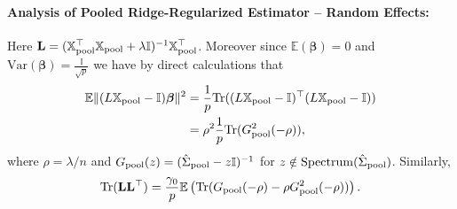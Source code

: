 \documentclass{article}
\theoremstyle{plain}
\theoremstyle{remark}
\def \bbeta{\boldsymbol{\beta}}
\def \bbeta{\boldsymbol{\beta}}
\def \Xm {\mathbb{X}_{\rm pool}}
\def \tr {\mathrm{Tr}}
\def \I{\mathcal{I}}
\def \E{\mathbb{E}}
\def \I {\mathbb{I}}
\begin{document}
\paragraph{Analysis of Pooled Ridge-Regularized Estimator -- Random Effects:} Here $\mathbf{L}=(\Xm^\top\Xm+\lambda\I)^{-1}\Xm^\top$. Moreover since $\E(\bbeta)=0$ and $\mathrm{Var}(\bbeta)=\frac{\I}{\sqrt{p}}$ we have by direct calculations that
\begin{align*}
    \E\|(L\mathbb{X}_{\rm pool}-\I)\bbeta\|^2&=\frac{1}{p}\tr((L\mathbb{X}_{\rm pool}-\I)^\top (L\mathbb{X}_{\rm pool}-\I))\\
    &=\rho^2\frac 1p\tr (G_{\rm pool}^2(-\rho)),
\end{align*}
where $\rho=\lambda/n$ and $G_{\rm pool}(z)=(\hat{\Sigma}_{\rm pool}-z\I)^{-1}$ for $z\notin \mathrm{Spectrum}(\hat{\Sigma}_{\rm pool})$. Similarly,
\begin{align*}
   \tr(\mathbf{L}\mathbf{L}^\top)=\frac{\gamma_0}{p}\E\left(\tr(G_{\rm pool}(-\rho)-\rho G_{\rm pool}^2(-\rho))\right).
\end{align*}
\end{document}
